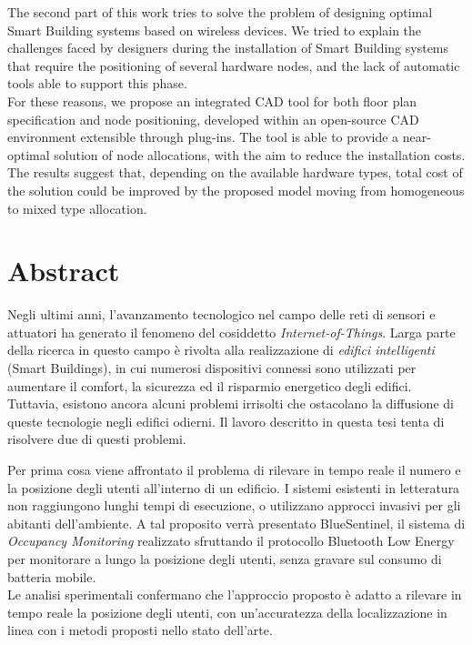 The second part of this work tries to solve the problem of designing optimal Smart Building systems based on wireless devices. We tried to explain the challenges faced by designers during the installation of Smart Building systems that require the positioning of several hardware nodes, and the lack of automatic tools able to support this phase.\\
For these reasons, we propose an integrated CAD tool for both floor plan specification and node positioning, developed within an \mbox{open-source} CAD environment extensible through plug-ins. The tool is able to provide a near-optimal solution of node allocations, with the aim to reduce the installation costs. The results suggest that, depending on the available hardware types, total cost of the solution could be improved by the proposed model moving from homogeneous to mixed type allocation.

%
\clearpage
%
%
%
\cleardoublepage
%
%
\chapter*{Abstract}
%
Negli ultimi anni, l'avanzamento tecnologico nel campo delle reti di sensori e attuatori ha generato il fenomeno del cosiddetto \emph{Internet-of-Things}. Larga parte della ricerca in questo campo è rivolta alla realizzazione di \emph{edifici intelligenti} (Smart Buildings), in cui numerosi dispositivi connessi sono utilizzati per aumentare il comfort, la sicurezza ed il risparmio energetico degli edifici. Tuttavia, esistono ancora alcuni problemi irrisolti che ostacolano la diffusione di queste tecnologie negli edifici odierni. Il lavoro descritto in questa tesi tenta di risolvere due di questi problemi.

Per prima cosa viene affrontato il problema di rilevare in tempo reale il numero e la posizione degli utenti all'interno di un edificio. I sistemi esistenti in letteratura non raggiungono lunghi tempi di esecuzione, o utilizzano approcci invasivi per gli abitanti dell'ambiente.
A tal proposito verrà presentato BlueSentinel, il sistema di \emph{Occupancy Monitoring} realizzato sfruttando il protocollo Bluetooth Low Energy per monitorare a lungo la posizione degli utenti, senza gravare sul consumo di batteria mobile.\\
Le analisi sperimentali confermano che l'approccio proposto è adatto a rilevare in tempo reale la posizione degli utenti, con un'accuratezza della localizzazione in linea con i metodi proposti nello stato dell'arte.

